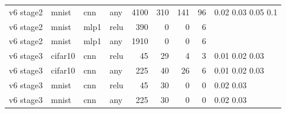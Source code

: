 \begin{table}[htbp]
{\begin{tabular}{@{}llllrrrrl@{}}
v6 stage2 & mnist & cnn & any & 4100 & 310 & 141 & 96 & 0.02 0.03 0.05 0.1 \\
v6 stage2 & mnist & mlp1 & relu & 390 & 0 & 0 & 6 &  \\
v6 stage2 & mnist & mlp1 & any & 1910 & 0 & 0 & 6 &  \\
v6 stage3 & cifar10 & cnn & relu & 45 & 29 & 4 & 3 & 0.01 0.02 0.03 \\
v6 stage3 & cifar10 & cnn & any & 225 & 40 & 26 & 6 & 0.01 0.02 0.03 \\
v6 stage3 & mnist & cnn & relu & 45 & 30 & 0 & 0 & 0.02 0.03 \\
v6 stage3 & mnist & cnn & any & 225 & 30 & 0 & 0 & 0.02 0.03 \\
\bottomrule
\end{tabular}}
\end{table}
